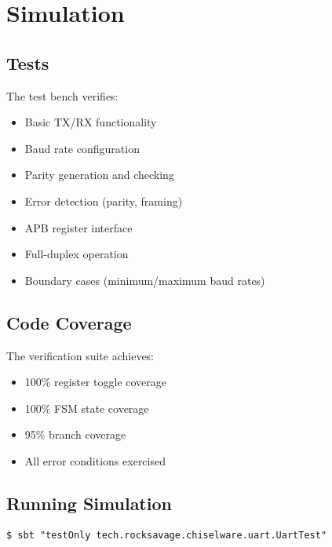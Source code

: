 \section{Simulation}
\subsection{Tests}
The test bench verifies:
\begin{itemize}
  \item Basic TX/RX functionality
  \item Baud rate configuration
  \item Parity generation and checking
  \item Error detection (parity, framing)
  \item APB register interface
  \item Full-duplex operation
  \item Boundary cases (minimum/maximum baud rates)
\end{itemize}

\subsection{Code Coverage}
The verification suite achieves:
\begin{itemize}
  \item 100\% register toggle coverage
  \item 100\% FSM state coverage
  \item 95\% branch coverage
  \item All error conditions exercised
\end{itemize}

\subsection{Running Simulation}
\begin{verbatim}
$ sbt "testOnly tech.rocksavage.chiselware.uart.UartTest"
\end{verbatim}